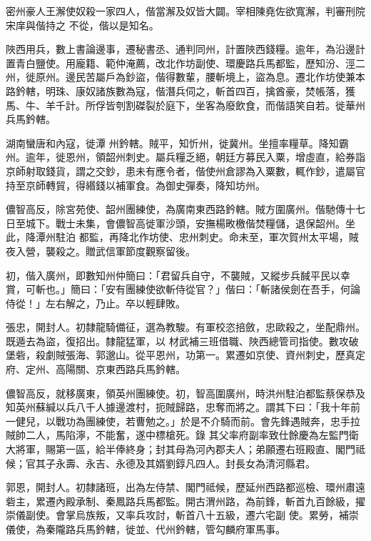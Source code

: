 \begin{pinyinscope}
 密州豪人王澥使奴殺一家四人，偕當澥及奴皆大闢。宰相陳堯佐欲寬澥，判審刑院宋庠與偕持之
 不從，偕以是知名。



 陜西用兵，數上書論邊事，遷秘書丞、通判同州，計置陜西錢糧。逾年，為沿邊計置青白鹽使。用龐籍、範仲淹薦，改北作坊副使、環慶路兵馬都監，歷知汾、涇二州，徙原州。邊民苦屬戶為鈔盜，偕得數輩，腰斬境上，盜為息。遷北作坊使兼本路鈐轄，明珠、康奴諸族數為寇，偕潛兵伺之，斬首四百，擒酋豪，焚帳落，獲馬、牛、羊千計。所俘皆刳割磔裂於庭下，坐客為廢飲食，而偕語笑自若。徙華州兵馬鈐轄。



 湖南蠻唐和內寇，徙潭
 州鈐轄。賊平，知忻州，徙冀州。坐擅率糧草。降知霸州。逾年，徙恩州，領韶州刺史。屬兵糧乏絕，朝廷方募民入粟，增虛直，給券詣京師射取錢貨，謂之交鈔，患未有應令者，偕使州倉謬為入粟數，輒作鈔，遣屬官持至京師轉貿，得緡錢以補軍食。為御史彈奏，降知坊州。



 儂智高反，除宮苑使、韶州團練使，為廣南東西路鈐轄。賊方圍廣州。偕馳傳十七日至城下。戰士未集，會儂智高徙軍沙頭，安撫楊畋檄偕焚糧儲，退保韶州。坐此，降潭州駐泊
 都監，再降北作坊使、忠州刺史。命未至，軍次賀州太平場，賊夜入營，襲殺之。贈武信軍節度觀察留後。



 初，偕入廣州，即數知州仲簡曰：「君留兵自守，不襲賊，又縱步兵馘平民以幸賞，可斬也。」簡曰：「安有團練使欲斬侍從官？」偕曰：「斬諸侯劍在吾手，何論侍從！」左右解之，乃止。卒以輕肆敗。



 張忠，開封人。初隸龍騎備征，選為教駿。有軍校恣掊斂，忠歐殺之，坐配鼎州。既遁去為盜，復招出。隸龍猛軍，以
 材武補三班借職、陜西總管司指使。數攻破堡砦，殺劇賊張海、郭邈山。從平恩州，功第一。累遷如京使、資州刺史，歷真定府、定州、高陽關、京東西路兵馬鈐轄。



 儂智高反，就移廣東，領英州團練使。初，智高圍廣州，時洪州駐泊都監蔡保恭及知英州蘇緘以兵八千人據邊渡村，扼賊歸路，忠奪而將之。謂其下曰：「我十年前一健兒，以戰功為團練使，若曹勉之。」於是不介騎而前。會先鋒遇賊奔，忠手拉賊帥二人，馬陷濘，不能奮，遂中標槍死。錄
 其父率府副率致仕餘慶為左監門衛大將軍，賜第一區，給半俸終身；封其母為河內郡夫人；弟願遷右班殿直、閣門祗候；官其子永壽、永吉、永德及其婿劉錞凡四人。封長女為清河縣君。



 郭恩，開封人。初隸諸班，出為左侍禁、閣門祗候，歷延州西路都巡檢、環州肅遠砦主，累遷內殿承制、秦鳳路兵馬都監。開古渭州路，為前鋒，斬首九百餘級，擢崇儀副使。會掌烏族叛，又率兵攻討，斬首八十五級，遷六宅副
 使。累勞，補崇儀使，為秦隴路兵馬鈐轄，徙並、代州鈐轄，管勾麟府軍馬事。




\end{pinyinscope}
